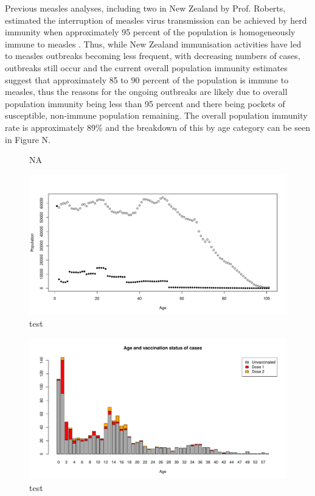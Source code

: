 \documentclass{article}
\begin{document}
Previous measles analyses, including two in New Zealand by Prof. Roberts, estimated the interruption of measles virus transmission can be achieved by herd immunity when approximately 95 percent of the population is homogeneously immune to measles \citep{roberts0,roberts4}. Thus, while New Zealand immunisation activities have led to measles outbreaks becoming less frequent, with decreasing numbers of cases, outbreaks still occur and the current overall population immunity estimates suggest that approximately 85 to 90 percent of the population is immune to measles, thus the reasons for the ongoing outbreaks are likely due to overall population immunity being less than 95 percent and there being pockets of susceptible, non-immune population remaining. The overall population immunity rate is approximately 89\% and the breakdown of this by age category can be seen in Figure N.

\begin{figure}[h!]
\begin{center}
\begin{Schunk}
\begin{Soutput}
[1] NA
\end{Soutput}
\end{Schunk}
\includegraphics{interimreport2-006}
\end{center}
\caption{test}
\label{fig:test}
\end{figure}


\begin{figure}[h!]
\begin{center}
\includegraphics{interimreport2-008}
\end{center}
\caption{test}
\label{fig:test}
\end{figure}
\end{document}
